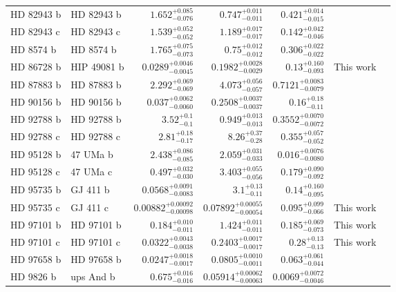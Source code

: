 \begin{longtable*}{llrrrrr}
HD 82943 b & HD 82943 b & $1.652^{+0.085}_{-0.076}$ & $0.747^{+0.011}_{-0.011}$ & $0.421^{+0.014}_{-0.015}$ & \cite{Mayor04} & \\
HD 82943 c & HD 82943 c & $1.539^{+0.052}_{-0.052}$ & $1.189^{+0.017}_{-0.017}$ & $0.142^{+0.042}_{-0.046}$ & \cite{Mayor04} & \\
HD 8574 b & HD 8574 b & $1.765^{+0.075}_{-0.073}$ & $0.75^{+0.012}_{-0.012}$ & $0.306^{+0.022}_{-0.022}$ & \cite{Perrier03} & \\
HD 86728 b & HIP 49081 b & $0.0289^{+0.0046}_{-0.0045}$ & $0.1982^{+0.0028}_{-0.0029}$ & $0.13^{+0.160}_{-0.093}$ & This work & \\
HD 87883 b & HD 87883 b & $2.292^{+0.069}_{-0.069}$ & $4.073^{+0.056}_{-0.057}$ & $0.7121^{+0.0083}_{-0.0079}$ & \cite{Fischer09} & \\
HD 90156 b & HD 90156 b & $0.037^{+0.0062}_{-0.0060}$ & $0.2508^{+0.0037}_{-0.0037}$ & $0.16^{+0.18}_{-0.11}$ & \cite{Mordasini11} & \\
HD 92788 b & HD 92788 b & $3.52^{+0.1}_{-0.1}$ & $0.949^{+0.013}_{-0.013}$ & $0.3552^{+0.0070}_{-0.0072}$ & \cite{Fischer01} & \\
HD 92788 c & HD 92788 c & $2.81^{+0.18}_{-0.17}$ & $8.26^{+0.37}_{-0.28}$ & $0.355^{+0.057}_{-0.052}$ & \cite{Rickman19} & \\
HD 95128 b & 47 UMa b & $2.438^{+0.086}_{-0.085}$ & $2.059^{+0.031}_{-0.033}$ & $0.016^{+0.0076}_{-0.0080}$ & \cite{Naef04} & \\
HD 95128 c & 47 UMa c & $0.497^{+0.032}_{-0.030}$ & $3.403^{+0.055}_{-0.056}$ & $0.179^{+0.090}_{-0.092}$ & \cite{Wittenmyer07} & \\
HD 95735 b & GJ 411 b & $0.0568^{+0.0091}_{-0.0083}$ & $3.1^{+0.13}_{-0.11}$ & $0.14^{+0.160}_{-0.095}$ & \cite{Diaz19} & \\
HD 95735 c & GJ 411 c & $0.00882^{+0.00092}_{-0.00098}$ & $0.07892^{+0.00055}_{-0.00054}$ & $0.095^{+0.099}_{-0.066}$ & This work & \\
HD 97101 b & HD 97101 b & $0.184^{+0.010}_{-0.011}$ & $1.424^{+0.011}_{-0.011}$ & $0.185^{+0.069}_{-0.073}$ & This work & \\
HD 97101 c & HD 97101 c & $0.0322^{+0.0043}_{-0.0038}$ & $0.2403^{+0.0017}_{-0.0017}$ & $0.28^{+0.13}_{-0.13}$ & This work & \\
HD 97658 b & HD 97658 b & $0.0247^{+0.0018}_{-0.0017}$ & $0.0805^{+0.0010}_{-0.0011}$ & $0.063^{+0.061}_{-0.044}$ & \cite{Howard11} & \\
HD 9826 b & ups And b & $0.675^{+0.016}_{-0.016}$ & $0.05914^{+0.00062}_{-0.00063}$ & $0.0069^{+0.0072}_{-0.0046}$ & \cite{Butler97} & \\

\end{longtable*}
